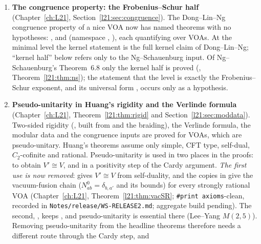 \begin{enumerate}
  : a $C_2$-cofinite analogue of Dong--Li--Mason's
  Theorem~8.1(c), decomposing ordinary modules into irreducibles. It is not either implication of the comparison.)
\item \textbf{The congruence property: the Frobenius--Schur half} (Chapter~\ref{ch:L21},
  Section~\ref{l21:sec:congruence}). The Dong--Lin--Ng congruence property of a nice VOA now has named theorems with no
  hypotheses: ,  and
   (namespace ,
  ), each quantifying over  VOAs. At the minimal level the kernel statement is the full
  kernel claim of Dong--Lin--Ng; ``kernel half'' below refers only to the Ng--Schauenburg input. Of Ng--Schauenburg's
  Theorem~6.8 only the kernel half is proved (, Theorem~\ref{l21:thm:ns}); the statement
  that the level is exactly the Frobenius--Schur exponent,  and its universal form
  , occurs only as a hypothesis.
\item \textbf{Pseudo-unitarity in Huang's rigidity and the Verlinde formula} (Chapter~\ref{ch:L21},
  Theorem~\ref{l21:thm:rigid} and Section~\ref{l21:sec:moddata}). Two-sided rigidity
  (, built from  and the braiding), the Verlinde
  formula, the modular data and the congruence inputs are proved for  VOAs, which are pseudo-unitary. Huang's
  theorems assume only simple, CFT type, self-dual, $C_2$-cofinite and rational. Pseudo-unitarity is used in two places in
  the proofs: to obtain $V'\cong V$, and in a positivity step of the Cardy argument. \emph{The first use is now removed}:
   gives $V'\cong V$ from self-duality, and the 
  copies in  give the vacuum-fusion chain ($N_{ab}^0=\delta_{b,a'}$ and its
  bounds) for every strongly rational VOA (Chapter~\ref{ch:L21}, Theorem~\ref{l21:thm:vacSR}; \texttt{\#print axioms}-clean,
  recorded in \texttt{Notes/release/WS-RELEASE2.md}; aggregate build pending). The second,
  , keeps , and pseudo-unitarity is essential there (Lee--Yang $M(2,5)$).
  Removing pseudo-unitarity from the headline theorems therefore needs a different route through the Cardy step, and

\end{enumerate}
